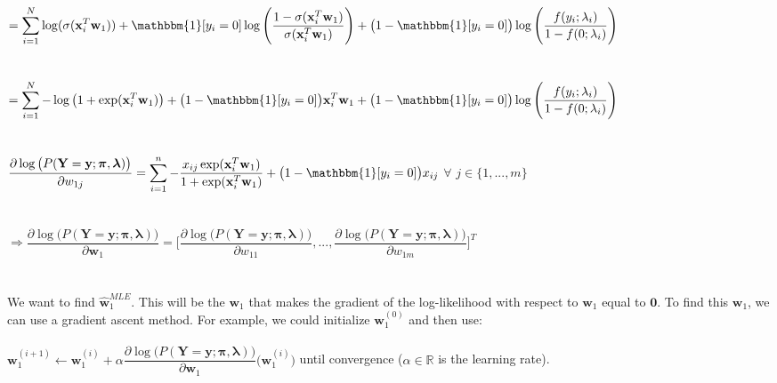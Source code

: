 \documentclass[submit]{harvardml}
\newcommand{\R}{\mathbb{R}}
\begin{document}
$=\displaystyle\sum_{i=1}^{N}\log(\sigma(\mathbf{x}_i^T\mathbf{w}_1))+\mathbbm{1}[y_i=0]\log\Bigg(\dfrac{1-\sigma(\mathbf{x}_i^T\mathbf{w}_1)}{\sigma(\mathbf{x}_i^T\mathbf{w}_1)}\Bigg)+\big(1-\mathbbm{1}[y_i=0]\big)\log\Bigg(\dfrac{f(y_i;\lambda_i)}{1-f(0;\lambda_i)}\Bigg)$\\\\\\
$=\displaystyle\sum_{i=1}^{N}-\log\big(1+\exp(\mathbf{x}_i^T\mathbf{w}_1)\big)+\big(1-\mathbbm{1}[y_i=0]\big)\mathbf{x}_i^T\mathbf{w}_1+\big(1-\mathbbm{1}[y_i=0]\big)\log\Bigg(\dfrac{f(y_i;\lambda_i)}{1-f(0;\lambda_i)}\Bigg)$\\\\\\
$\dfrac{\partial\log\big(P(\mathbf{Y}=\mathbf{y};\bm{\pi},\bm{\lambda})\big)}{\partial w_{1j}}=\displaystyle\sum_{i=1}^{n}-\dfrac{x_{ij}\exp(\mathbf{x}_i^T\mathbf{w}_1)}{1+\exp(\mathbf{x}_i^T\mathbf{w}_1)}+\big(1-\mathbbm{1}[y_i=0]\big)x_{ij}$ $\forall$ $j\in\{1,...,m\}$\\\\\\
$\Rightarrow\dfrac{\partial\log\big(P(\mathbf{Y}=\mathbf{y};\bm{\pi},\bm{\lambda})\big)}{\partial\mathbf{w}_1}=\Bigg[\dfrac{\partial\log\big(P(\mathbf{Y}=\mathbf{y};\bm{\pi},\bm{\lambda})\big)}{\partial w_{11}},...,\dfrac{\partial\log\big(P(\mathbf{Y}=\mathbf{y};\bm{\pi},\bm{\lambda})\big)}{\partial w_{1m}}\Bigg]^T$\\\\\\
We want to find $\mathbf{\hat w}_1^{MLE}$. This will be the $\mathbf{w}_1$ that makes the gradient of the log-likelihood with respect to $\mathbf{w}_1$ equal to $\mathbf{0}$. To find this $\mathbf{w}_1$, we can use a gradient ascent method. For example, we could initialize $\mathbf{w}_1^{(0)}$ and then use:\\\\
$\mathbf{w}_1^{(i+1)}\leftarrow\mathbf{w}_1^{(i)}+\alpha\dfrac{\partial\log\big(P(\mathbf{Y}=\mathbf{y};\bm{\pi},\bm{\lambda})\big)}{\partial\mathbf{w}_1}\big(\mathbf{w}_1^{(i)}\big)$ until convergence ($\alpha\in\R$ is the learning rate).\\\\\\
\end{document}
